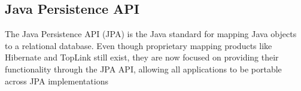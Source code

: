 \subsection{Java Persistence API}
The Java Persistence API (JPA) is the Java standard for mapping Java objects to a relational database. Even though proprietary mapping products like Hibernate and TopLink still exist, they are now focused on providing their functionality through the JPA API, allowing all applications to be portable across JPA implementations
